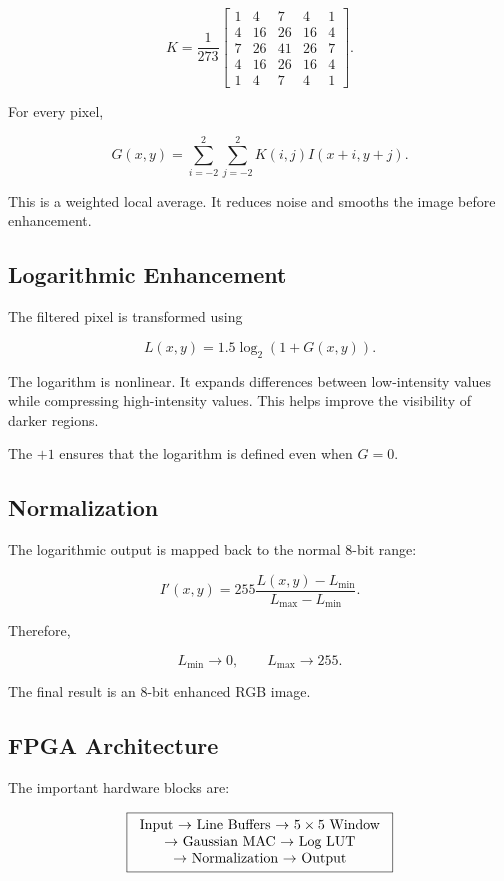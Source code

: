\documentclass[10pt,twocolumn,letterpaper]{article}
\begin{document}
\[
K=\frac{1}{273}
\begin{bmatrix}
1&4&7&4&1\\
4&16&26&16&4\\
7&26&41&26&7\\
4&16&26&16&4\\
1&4&7&4&1
\end{bmatrix}.
\]

For every pixel,

\[
G(x,y)=\sum_{i=-2}^{2}\sum_{j=-2}^{2}
K(i,j)I(x+i,y+j).
\]

This is a weighted local average. It reduces noise and smooths the image before enhancement.

\subsection{Logarithmic Enhancement}

The filtered pixel is transformed using

\[
L(x,y)=1.5\log_2(1+G(x,y)).
\]

The logarithm is nonlinear. It expands differences between low-intensity values while compressing high-intensity values. This helps improve the visibility of darker regions.

The $+1$ ensures that the logarithm is defined even when $G=0$.

\subsection{Normalization}

The logarithmic output is mapped back to the normal 8-bit range:

\[
I'(x,y)=255
\frac{L(x,y)-L_{\min}}
{L_{\max}-L_{\min}}.
\]

Therefore,

\[
L_{\min}\rightarrow0,\qquad
L_{\max}\rightarrow255.
\]

The final result is an 8-bit enhanced RGB image.

\subsection{FPGA Architecture}

The important hardware blocks are:

\[
\boxed{
\begin{tabular}{c}
\text{Input} $\rightarrow$ \text{Line Buffers} $\rightarrow$ $5\times5$\text{ Window} \\
$\rightarrow$ \text{Gaussian MAC} $\rightarrow$ \text{Log LUT} \\
$\rightarrow$ \text{Normalization} $\rightarrow$ \text{Output}
\end{tabular}
}
\]
\end{document}
